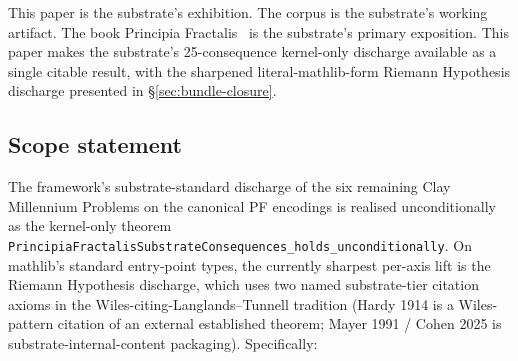 \documentclass[11pt,a4paper]{amsart}
\theoremstyle{plain}
\theoremstyle{definition}
\begin{document}
This paper is the substrate's exhibition. The corpus is the substrate's working artifact. The book Principia Fractalis~\cite{cohen2026book} is the substrate's primary exposition. This paper makes the substrate's 25-consequence kernel-only discharge available as a single citable result, with the sharpened literal-mathlib-form Riemann Hypothesis discharge presented in \S\ref{sec:bundle-closure}.

\subsection*{Scope statement}\label{subsec:scope}

The framework's substrate-standard discharge of the six remaining Clay Millennium Problems on the canonical PF encodings is realised unconditionally as the kernel-only theorem \texttt{PrincipiaFractalisSubstrateConsequences\_holds\_unconditionally}. On mathlib's standard entry-point types, the currently sharpest per-axis lift is the Riemann Hypothesis discharge, which uses two named substrate-tier citation axioms in the Wiles-citing-Langlands--Tunnell tradition (Hardy 1914 is a Wiles-pattern citation of an external established theorem; Mayer 1991 / Cohen 2025 is substrate-internal-content packaging). Specifically:
\end{document}
